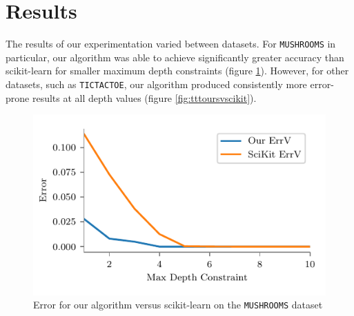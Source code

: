 \documentclass[screen, authorversion, nonacm, sigconf]{acmart}
\begin{document}
\section{Results}

The results of our experimentation varied between datasets. For \texttt{MUSHROOMS} in particular, our algorithm was able to achieve significantly greater accuracy than scikit-learn for smaller maximum depth constraints (figure \ref{fig:mushoursvscikit}). However, for other datasets, such as \texttt{TICTACTOE}, our algorithm produced consistently more error-prone results at all depth values (figure \ref{fig:tttoursvscikit}).

\begin{figure}
  \centering
  \includegraphics[width=\columnwidth]{figures/chart_ours_v_scikit_mushrooms.pdf}
  \caption{Error for our algorithm versus scikit-learn on the \texttt{MUSHROOMS} dataset}
  \label{fig:mushoursvscikit}
\end{figure}
\end{document}
